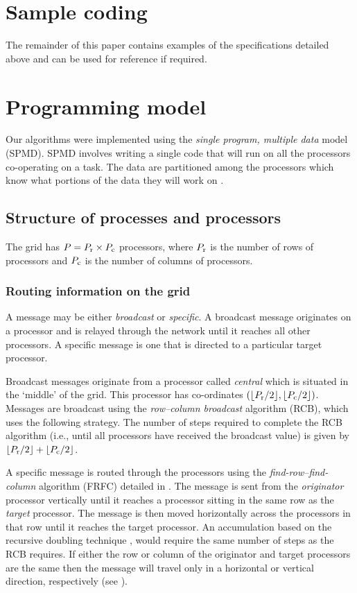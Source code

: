 \documentclass{ecai}  %
\begin{document}
\section{Sample coding}
The remainder of this paper contains examples of the specifications
detailed above and can be used for reference if required.

\section{Programming model}
\label{par}
Our algorithms were implemented using the \emph{single program,
  multiple data} model (SPMD). SPMD involves writing a single code
that will run on all the processors co-operating on a task. The data
are partitioned among the processors which know what portions of the
data they will work on \cite{kn:Golub89}.

\subsection{Structure of processes and processors}
\label{procstruct}
The grid has $P=P_{\rm{r}}\times P_{\rm{c}}$ processors, where
$P_{\rm{r}}$ is the number of rows of processors and $P_{\rm{c}}$ is
the number of columns of processors.

\subsubsection{Routing information on the grid}
\label{routing} A message may be either \emph{broadcast} or {\em
  specific}. A broadcast message originates on a processor and is
relayed through the network until it reaches all other processors. A
specific message is one that is directed to a particular target
processor.

Broadcast messages originate from a processor called \emph{central}
which is situated in the `middle' of the grid. This processor has
co-ordinates $(\lfloor P_{\rm{r}}/2 \rfloor,\lfloor P_{\rm{c}}/2
\rfloor)$.  Messages are broadcast using the \emph{row--column
  broadcast} algorithm (RCB), which uses the following strategy.  The
number of steps required to complete the RCB algorithm (i.e., until
all processors have received the broadcast value) is given by $\lfloor
P_{\rm{r}}/2\rfloor+\lfloor P_{\rm{c}}/2\rfloor$.

A specific message is routed through the processors using the
\emph{find-row--find-column} algorithm (FRFC) detailed in
\cite{kn:deCarlini91}.  The message is sent from the \emph{originator}
processor vertically until it reaches a processor sitting in the same
row as the \emph{target} processor. The message is then moved
horizontally across the processors in that row until it reaches the
target processor. An accumulation based on the recursive doubling
technique \cite[pp. 56--61]{kn:Modi88}, would require the same number
of steps as the RCB requires. If either the row or column of the
originator and target processors are the same then the message will
travel only in a horizontal or vertical direction, respectively (see
\cite{kn:Smith85}).
\end{document}
